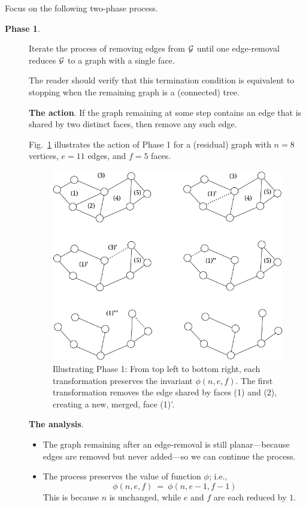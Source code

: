 \noindent
Focus on the following two-phase process.
\begin{description}
\item[{\bf Phase 1}.]
Iterate the process of removing edges from $\mbox{$\cal G$}$ until one edge-removal reduces $\mbox{$\cal G$}$ to
a graph with a single face.

The reader should verify that this termination condition is  equivalent to stopping when the remaining
graph is a (connected) tree.

\bigskip

{\bf The action}.
If the graph remaining at some step contains an edge that is shared by
two distinct faces, then remove any such edge.

\smallskip

Fig.~\ref{fig:planarStep1} illustrates the action of Phase 1 for a
(residual) graph with $n=8$ vertices, $e=11$ edges, and $f=5$ faces.
\begin{figure}[hbt]
\begin{center}
   \includegraphics[scale=0.35]{FiguresGraph/planarStep1}
\caption{Illustrating Phase 1: From top left to bottom right, each
  transformation preserves the invariant $\phi(n,e,f)$.  The first
  transformation removes the edge shared by faces (1) and (2),
  creating a new, merged, face (1)'.}
  \label{fig:planarStep1}
\end{center}
\end{figure}

\bigskip

{\bf The analysis}.
\begin{itemize}
\item
The graph remaining after an edge-removal is still planar---because edges are
removed but never added---so we can continue the process.
\item
The process preserves the value of function $\phi$; i.e.,
\[ \phi(n,e,f) \ = \ \phi(n,e-1,f-1) \]
This is because $n$ is unchanged, while $e$ and $f$ are each reduced by $1$.
\end{itemize}


\end{description}
